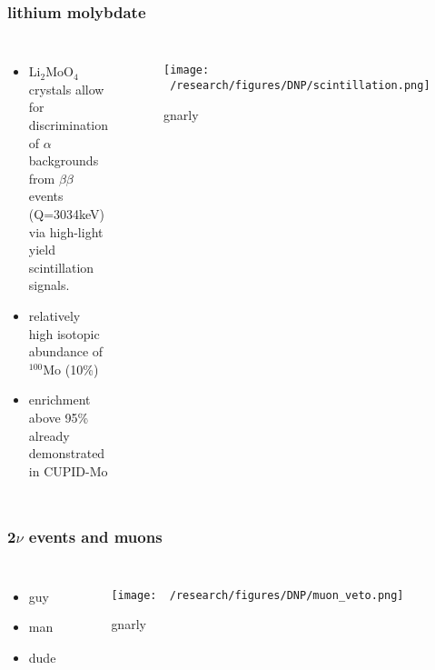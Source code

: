 \documentclass{beamer}
\begin{document}
	\begin{frame}
		\frametitle{lithium molybdate}
		\begin{columns}[c] %
			
			\begin{itemize}
				\item Li$_2$MoO$_4$ crystals allow for discrimination of $\alpha$ backgrounds from $\beta\beta$ events (Q=3034keV) via high-light yield scintillation signals.
				\item relatively high isotopic abundance of $^{100}$Mo (10\%)
				\item enrichment above 95\% already demonstrated in CUPID-Mo \cite{}
			\end{itemize}
			
			\begin{figure}
			\texttt{[image: ~/research/figures/DNP/scintillation.png]}
			\caption{gnarly}
			\end{figure}
		\end{columns}
	\end{frame}

	

	\begin{frame}
		\frametitle{2$\nu$ events and muons}
		\begin{columns}[c] %
			
			\begin{itemize}
				\item guy
				\item man
				\item dude
			\end{itemize}
			
			\begin{figure}
			\texttt{[image: ~/research/figures/DNP/muon\_veto.png]}
			\caption{gnarly}
			\end{figure}
			
		\end{columns}
	\end{frame}
\end{document}
